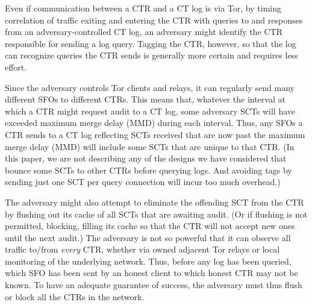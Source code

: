 
Even if communication between a CTR and a CT log is
via Tor, by timing correlation of traffic exiting and entering the CTR
with queries to and responses from an adversary-controlled CT log, an
adversary might identify the CTR responsible for sending a log
query. Tagging the CTR, however, so that the log can recognize queries
the CTR sends is generally more certain and requires less effort.

 Since the adversary controls Tor clients and
relays, it can regularly send many different SFOs to different
CTRs. This means that, whatever the interval at which a CTR might
request audit to a CT log, some adversary SCTs will have exceeded
maximum merge delay (MMD) during each interval.  Thus, any SFOs a CTR
sends to a CT log reflecting SCTs received that are now past the
maximum merge delay (MMD) will include some SCTs that are unique to
that CTR\@. (In this paper, we are not describing any of the designs
we have considered that bounce some SCTs to other CTRs before querying
logs. And avoiding tags by sending just one SCT per query connection
will incur too much overhead.)

 The adversary might also attempt to
eliminate the offending SCT from the CTR by flushing out its cache of
all SCTs that are awaiting audit\@. (Or if flushing is not permitted,
blocking, filling its cache so that the CTR will not accept new ones
until the next audit.) 
The adversary is not so powerful that it can observe all traffic to/from
\emph{every} CTR, whether via owned adjacent Tor relays or local
monitoring of the underlying network.  Thus, before any log has been
queried, which SFO has been sent by an honest client to which honest
CTR may not be known. To have an adequate guarantee of success, the
adversary must thus flush or block all the CTRs in the network.



